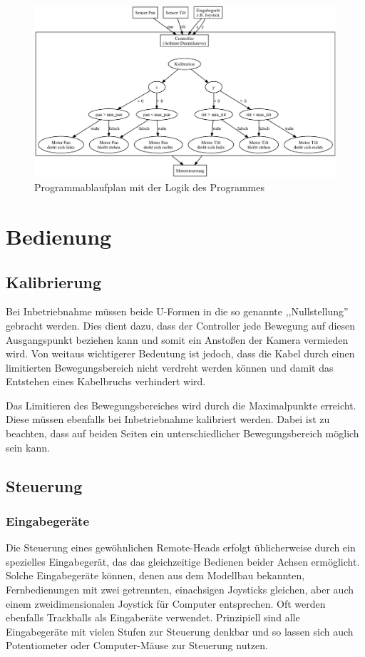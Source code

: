 \documentclass[a4paper, 12pt, bibtotocnumbered, liststotocnumbered]{scrartcl}
\begin{document}
	\begin{figure}[htb]
		\centering
		\includegraphics[scale=0.7,angle=90]{Bilder/Programmablaufplan}
		\caption{Programmablaufplan mit der Logik des Programmes}
		\label{Programmablaufplan}
	\end{figure}

	\section{Bedienung}
	\subsection{Kalibrierung}
	Bei Inbetriebnahme müssen beide U-Formen in die so genannte ,,Nullstellung” gebracht werden. Dies dient dazu, dass der Controller jede Bewegung auf diesen Ausgangspunkt beziehen kann und somit ein Anstoßen der Kamera vermieden wird. Von weitaus wichtigerer Bedeutung ist jedoch, dass die Kabel durch einen limitierten Bewegungsbereich nicht verdreht werden können und damit das Entstehen eines Kabelbruchs verhindert wird.

	Das Limitieren des Bewegungsbereiches wird durch die Maximalpunkte erreicht. Diese müssen ebenfalls bei Inbetriebnahme kalibriert werden. Dabei ist zu beachten, dass auf beiden Seiten ein unterschiedlicher Bewegungsbereich möglich sein kann.

	\subsection{Steuerung}
	\subsubsection{Eingabegeräte}
	Die Steuerung eines gewöhnlichen Remote-Heads erfolgt üblicherweise durch ein spezielles Eingabegerät, das das gleichzeitige Bedienen beider Achsen ermöglicht. Solche Eingabegeräte können, denen aus dem Modellbau bekannten, Fernbedienungen mit zwei getrennten, einachsigen Joysticks gleichen, aber auch einem zweidimensionalen Joystick für Computer entsprechen. Oft werden ebenfalls Trackballs als Eingaberäte verwendet. Prinzipiell sind alle Eingabegeräte mit vielen Stufen zur Steuerung denkbar und so lassen sich auch Potentiometer oder Computer-Mäuse zur Steuerung nutzen.
\end{document}
